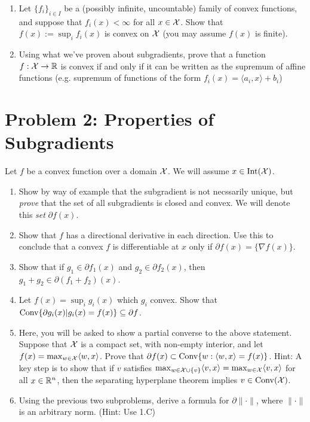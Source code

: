 \documentclass[12pt]{article}
\begin{document}
\begin{enumerate}
\item
Let $\{f_{i}\}_{i \in I}$ be a (possibly infinite, uncountable) family of convex functions, and suppose that $f_{i}(x) < \infty$ for all $x \in {\cal X}$. Show that $f(x) := \sup_{i} f_{i}(x)$ is convex on ${\cal X}$ (you may assume $f(x)$ is finite).

\item
Using what we've proven about subgradients, prove that a function $f: {\cal X} \to \mathbb{R}$ is convex if and only if it can be written as the supremum of affine functions (e.g. supremum of functions of the form $f_i(x) = \langle a_{i}, x \rangle + b_{i}$)
\end{enumerate}

\section*{Problem 2: Properties of Subgradients}
Let $f$ be a convex function over a domain ${\cal X}$. We will assume $x \in \mathrm{Int}({\cal X})$. 
\begin{enumerate}
\item
Show by way of example that the subgradient is not necssarily unique, but \emph{prove} that the set of all subgradients is closed and convex. We will denote this \emph{set} $\partial f(x)$.
\item Show that $f$ has a directional derivative in each direction. Use this to conclude that a convex $f$ is differentiable at $x$ only if $\partial f(x) = \{\nabla f(x)\}$.
\item
Show that if $g_1 \in \partial f_1(x)$ and $g_2 \in \partial f_2(x)$, then $g_1 + g_2 \in \partial(f_1 + f_2)(x)$. 
\item
Let $f(x) = \sup_{i} g_{i}(x)$ which $g_{i}$ convex. Show that $\mathrm{Conv} \{\partial g_{i}(x) |  g_{i}(x) =f(x) \} \subseteq \partial f$. 
\item Here, you will be asked to show a partial converse to the above statement. Suppose that ${\cal X}$ is a compact set, with non-empty interior, and let $f(x) = \max_{w \in {\cal X}} \langle w, x \rangle$. Prove that $\partial f(x) \subset \mathrm{Conv} \{w: \langle w, x \rangle = f(x)\}$. Hint: A key step is to show that if $v$ satisfies $\max_{w \in {\cal X} \cup \{v\}} \langle v, x \rangle = \max_{w \in {\cal X}} \langle v, x \rangle$ for all $x \in \mathbb{R}^n$, then the separating hyperplane theorem implies $v \in \mathrm{Conv}({\cal X})$.
\item Using the previous two subproblems, derive a formula for $\partial \|\cdot\|$, where $\|\cdot\|$ is an arbitrary norm. (Hint: Use 1.C)
\end{enumerate}
\end{document}
